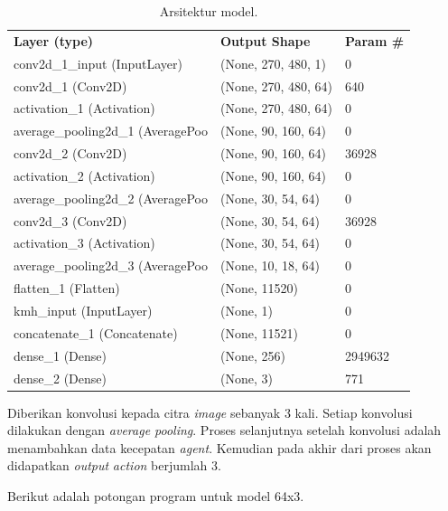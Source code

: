 \begin{table}[H]
	\begin{tabular}{lll}
		\textbf{Layer (type)}                      & \textbf{Output Shape}         & \textbf{Param \#} \\
		conv2d\_1\_input (InputLayer)     & (None, 270, 480, 1)  & 0        \\
		conv2d\_1 (Conv2D)                & (None, 270, 480, 64) & 640      \\
		activation\_1 (Activation)        & (None, 270, 480, 64) & 0        \\
		average\_pooling2d\_1 (AveragePoo & (None, 90, 160, 64)  & 0        \\
		conv2d\_2 (Conv2D)                & (None, 90, 160, 64)  & 36928    \\
		activation\_2 (Activation)        & (None, 90, 160, 64)  & 0        \\
		average\_pooling2d\_2 (AveragePoo & (None, 30, 54, 64)   & 0        \\
		conv2d\_3 (Conv2D)                & (None, 30, 54, 64)   & 36928    \\
		activation\_3 (Activation)        & (None, 30, 54, 64)   & 0        \\
		average\_pooling2d\_3 (AveragePoo & (None, 10, 18, 64)   & 0        \\
		flatten\_1 (Flatten)              & (None, 11520)        & 0        \\
		kmh\_input (InputLayer)           & (None, 1)            & 0        \\
		concatenate\_1 (Concatenate)      & (None, 11521)        & 0        \\
		dense\_1 (Dense)                  & (None, 256)          & 2949632  \\
		dense\_2 (Dense)                  & (None, 3)            & 771     
	\end{tabular}
\caption{Arsitektur model.}
\label{tb:arsitektur_model}
\end{table}

Diberikan konvolusi kepada citra \textit{image} sebanyak 3 kali. Setiap konvolusi dilakukan dengan \textit{average pooling}. Proses selanjutnya setelah konvolusi adalah menambahkan data kecepatan \textit{agent}. Kemudian pada akhir dari proses akan didapatkan \textit{output} \textit{action} berjumlah 3.

Berikut adalah potongan program untuk model 64x3.


